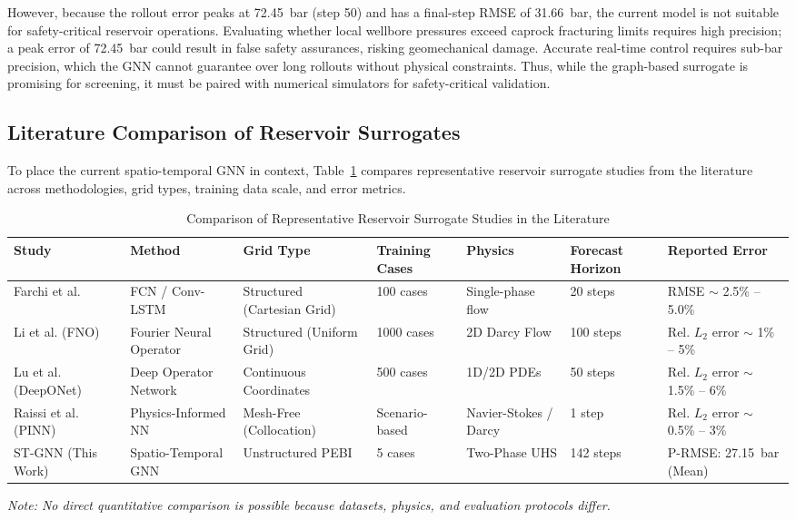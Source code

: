 However, because the rollout error peaks at 72.45~bar (step 50) and has a final-step RMSE of 31.66~bar, the current model is not suitable for safety-critical reservoir operations. Evaluating whether local wellbore pressures exceed caprock fracturing limits requires high precision; a peak error of 72.45~bar could result in false safety assurances, risking geomechanical damage. Accurate real-time control requires sub-bar precision, which the GNN cannot guarantee over long rollouts without physical constraints. Thus, while the graph-based surrogate is promising for screening, it must be paired with numerical simulators for safety-critical validation.

\subsection{Literature Comparison of Reservoir Surrogates}
To place the current spatio-temporal GNN in context, Table~\ref{tab:lit_comparison} compares representative reservoir surrogate studies from the literature across methodologies, grid types, training data scale, and error metrics.

\begin{table}[htbp]
\centering
\caption{Comparison of Representative Reservoir Surrogate Studies in the Literature}
\label{tab:lit_comparison}
\begin{tabularx}{\textwidth}{lXXXXXX}
\toprule
\textbf{Study} & \textbf{Method} & \textbf{Grid Type} & \textbf{Training Cases} & \textbf{Physics} & \textbf{Forecast Horizon} & \textbf{Reported Error} \\
\midrule
Farchi et al.~\cite{farchi2021} & FCN / Conv-LSTM & Structured (Cartesian Grid) & 100 cases & Single-phase flow & 20 steps & RMSE $\sim$ 2.5\% -- 5.0\% \\
Li et al. (FNO)~\cite{li2020fno} & Fourier Neural Operator & Structured (Uniform Grid) & 1000 cases & 2D Darcy Flow & 100 steps & Rel. $L_2$ error $\sim$ 1\% -- 5\% \\
Lu et al. (DeepONet)~\cite{lu2021deeponet} & Deep Operator Network & Continuous Coordinates & 500 cases & 1D/2D PDEs & 50 steps & Rel. $L_2$ error $\sim$ 1.5\% -- 6\% \\
Raissi et al. (PINN)~\cite{raissi2019pinn} & Physics-Informed NN & Mesh-Free (Collocation) & Scenario-based & Navier-Stokes / Darcy & 1 step & Rel. $L_2$ error $\sim$ 0.5\% -- 3\% \\
ST-GNN (This Work) & Spatio-Temporal GNN & Unstructured PEBI & 5 cases & Two-Phase UHS & 142 steps & P-RMSE: 27.15~bar (Mean) \\
\bottomrule
\end{tabularx}
\begin{flushleft}
\small \textit{Note: No direct quantitative comparison is possible because datasets, physics, and evaluation protocols differ.}
\end{flushleft}
\end{table}
